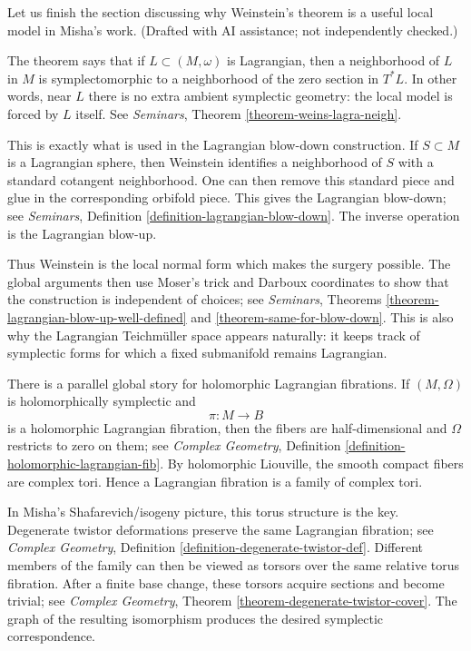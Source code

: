 \medskip\noindent
Let us finish the section
discussing why Weinstein's theorem is a
useful local model in Misha's work.
(Drafted with AI assistance; not independently checked.)

\medskip\noindent
The theorem says that if
$L\subset (M,\omega)$ is Lagrangian, then a
neighborhood of $L$ in $M$ is symplectomorphic
to a neighborhood of the zero section in
$T^*L$. In other words, near $L$ there is no
extra ambient symplectic geometry:
the local model is forced by $L$ itself.
See \emph{Seminars}, Theorem
\ref{theorem-weins-lagra-neigh}.

\medskip\noindent
This is exactly what is used in the
Lagrangian blow-down construction. If
$S\subset M$ is a Lagrangian sphere, then
Weinstein identifies a neighborhood of $S$
with a standard cotangent neighborhood.
One can then remove this standard piece and
glue in the corresponding orbifold piece.
This gives the Lagrangian blow-down; see
\emph{Seminars}, Definition
\ref{definition-lagrangian-blow-down}.
The inverse operation is the Lagrangian
blow-up.

\medskip\noindent
Thus Weinstein is the local normal form
which makes the surgery possible. The global
arguments then use Moser's trick and Darboux
coordinates to show that the construction is
independent of choices; see
\emph{Seminars}, Theorems
\ref{theorem-lagrangian-blow-up-well-defined}
and \ref{theorem-same-for-blow-down}.
This is also why the Lagrangian
Teichmüller space appears naturally: it keeps
track of symplectic forms for which a fixed
submanifold remains Lagrangian.

\medskip\noindent
There is a parallel global story for
holomorphic Lagrangian fibrations. If
$(M,\Omega)$ is holomorphically symplectic
and
$$
\pi:M\to B
$$
is a holomorphic Lagrangian fibration, then
the fibers are half-dimensional and
$\Omega$ restricts to zero on them; see
\emph{Complex Geometry}, Definition
\ref{definition-holomorphic-lagrangian-fib}.
By holomorphic Liouville, the smooth compact
fibers are complex tori. Hence a Lagrangian
fibration is a family of complex tori.

\medskip\noindent
In Misha's Shafarevich/isogeny picture, this
torus structure is the key. Degenerate
twistor deformations preserve the same
Lagrangian fibration; see
\emph{Complex Geometry}, Definition
\ref{definition-degenerate-twistor-def}.
Different members of the family can then be
viewed as torsors over the same relative
torus fibration. After a finite base change,
these torsors acquire sections and become
trivial; see \emph{Complex Geometry},
Theorem \ref{theorem-degenerate-twistor-cover}.
The graph of the resulting isomorphism
produces the desired symplectic
correspondence.

